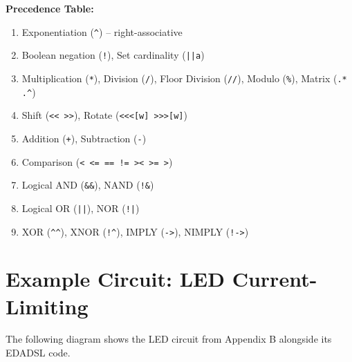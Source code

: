 \vspace{5mm}
\textbf{Precedence Table:}
\begin{enumerate}
\item Exponentiation (\texttt{\^{}}) -- right-associative
\item Boolean negation (\texttt{!}), Set cardinality (\texttt{||a})
\item Multiplication (\texttt{*}), Division (\texttt{/}), Floor Division (\texttt{//}), Modulo (\texttt{\%}), Matrix (\texttt{.* .\^{}})
\item Shift (\texttt{<< >>}), Rotate (\texttt{<<<[w] >>>[w]})
\item Addition (\texttt{+}), Subtraction (\texttt{-})
\item Comparison (\texttt{< <= == != >< >= >})
\item Logical AND (\texttt{\&\&}), NAND (\texttt{!\&})
\item Logical OR (\texttt{||}), NOR (\texttt{!|})
\item XOR (\texttt{\^{}}\texttt{\^{}}), XNOR (\texttt{!}\texttt{\^{}}), IMPLY (\texttt{->}), NIMPLY (\texttt{!->})
\end{enumerate}

\section{Example Circuit: LED Current-Limiting}
The following diagram shows the LED circuit from Appendix B alongside its EDADSL code.

\begin{center}
\end{center}

